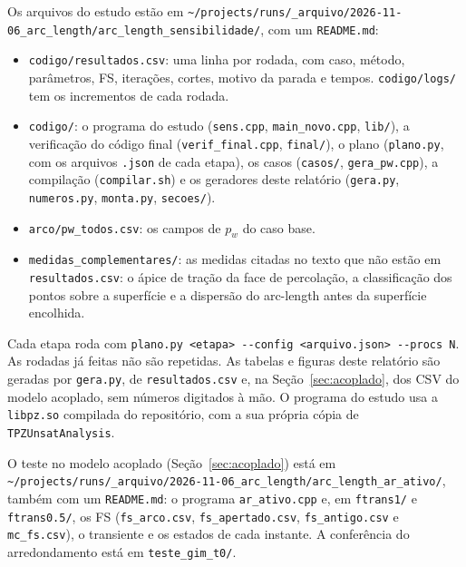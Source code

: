 \documentclass[11pt,a4paper]{article}
\numberwithin{equation}{section}
\begin{document}
Os arquivos do estudo estão em \texttt{\textasciitilde/projects/runs/\_arquivo/2026-11-06\_arc\_length/arc\_length\_sensibilidade/}, com um \texttt{README.md}:
\begin{itemize}
\item \texttt{codigo/resultados.csv}: uma linha por rodada, com caso, método, parâmetros, FS, iterações, cortes, motivo da parada e tempos. \texttt{codigo/logs/} tem os incrementos de cada rodada.
\item \texttt{codigo/}: o programa do estudo (\texttt{sens.cpp}, \texttt{main\_novo.cpp}, \texttt{lib/}), a verificação do código final (\texttt{verif\_final.cpp}, \texttt{final/}), o plano (\texttt{plano.py}, com os arquivos \texttt{.json} de cada etapa), os casos (\texttt{casos/}, \texttt{gera\_pw.cpp}), a compilação (\texttt{compilar.sh}) e os geradores deste relatório (\texttt{gera.py}, \texttt{numeros.py}, \texttt{monta.py}, \texttt{secoes/}).
\item \texttt{arco/pw\_todos.csv}: os campos de $p_w$ do caso base.
\item \texttt{medidas\_complementares/}: as medidas citadas no texto que não estão em \texttt{resultados.csv}: o ápice de tração da face de percolação, a classificação dos pontos sobre a superfície e a dispersão do arc-length antes da superfície encolhida.
\end{itemize}
Cada etapa roda com \texttt{plano.py <etapa> -{}-config <arquivo.json> -{}-procs N}. As rodadas já feitas não são repetidas. As tabelas e figuras deste relatório são geradas por \texttt{gera.py}, de \texttt{resultados.csv} e, na Seção~\ref{sec:acoplado}, dos CSV do modelo acoplado, sem números digitados à mão. O programa do estudo usa a \texttt{libpz.so} compilada do repositório, com a sua própria cópia de \texttt{TPZUnsatAnalysis}.

O teste no modelo acoplado (Seção~\ref{sec:acoplado}) está em \texttt{\textasciitilde/projects/runs/\_arquivo/2026-11-06\_arc\_length/arc\_length\_ar\_ativo/}, também com um \texttt{README.md}: o programa \texttt{ar\_ativo.cpp} e, em \texttt{ftrans1/} e \texttt{ftrans0.5/}, os FS (\texttt{fs\_arco.csv}, \texttt{fs\_apertado.csv}, \texttt{fs\_antigo.csv} e \texttt{mc\_fs.csv}), o transiente e os estados de cada instante. A conferência do arredondamento está em \texttt{teste\_gim\_t0/}.
\end{document}
